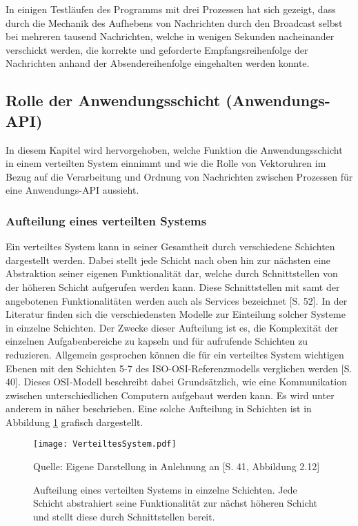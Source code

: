 In einigen Testläufen des Programms mit drei Prozessen hat sich gezeigt, dass durch die Mechanik des Aufhebens von Nachrichten durch den Broadcast selbst bei mehreren tausend Nachrichten, welche in wenigen Sekunden nacheinander verschickt werden, die korrekte und geforderte Empfangsreihenfolge der Nachrichten anhand der Absendereihenfolge eingehalten werden konnte.

\FloatBarrier

\subsection{Rolle der Anwendungsschicht (Anwendungs-API)}
\label{RolleDerAnwendung}
In diesem Kapitel wird hervorgehoben, welche Funktion die Anwendungsschicht in einem verteilten System einnimmt und wie die Rolle von Vektoruhren im Bezug auf die Verarbeitung und Ordnung von Nachrichten zwischen Prozessen für eine Anwendungs-API aussieht.

\subsubsection{Aufteilung eines verteilten Systems}
Ein verteiltes System kann in seiner Gesamtheit durch verschiedene Schichten dargestellt werden. Dabei stellt jede Schicht nach oben hin zur nächsten eine Abstraktion seiner eigenen Funktionalität dar, welche durch Schnittstellen von der höheren Schicht aufgerufen werden kann. Diese Schnittstellen mit samt der angebotenen Funktionalitäten werden auch als Services bezeichnet \cite{Coulouris2011}[S. 52]. In der Literatur finden sich die verschiedensten Modelle zur Einteilung solcher Systeme in einzelne Schichten. Der Zwecke dieser Aufteilung ist es, die Komplexität der einzelnen Aufgabenbereiche zu kapseln und für aufrufende Schichten zu reduzieren. Allgemein gesprochen können die für ein verteiltes System wichtigen Ebenen mit den Schichten 5-7 des ISO-OSI-Referenzmodells verglichen werden \cite{schill12}[S. 40]. Dieses OSI-Modell beschreibt dabei Grundsätzlich, wie eine Kommunikation zwischen unterschiedlichen Computern aufgebaut werden kann. Es wird unter anderem in \cite{ISOOSI} näher beschrieben. Eine solche Aufteilung in Schichten ist in Abbildung \ref{figure:schichtenaufbau} grafisch dargestellt.

 \begin{figure}[ht]
 	\centering
 	\texttt{[image: VerteiltesSystem.pdf]}
 	\caption[Verteiltes System als Schichtemodell]{Aufteilung eines verteilten Systems in einzelne Schichten. Jede Schicht abstrahiert seine Funktionalität zur nächst höheren Schicht und stellt diese durch Schnittstellen bereit.}
 	Quelle: Eigene Darstellung in Anlehnung an \cite{schill12}[S. 41, Abbildung 2.12]
 	\label{figure:schichtenaufbau}
 \end{figure}
 
